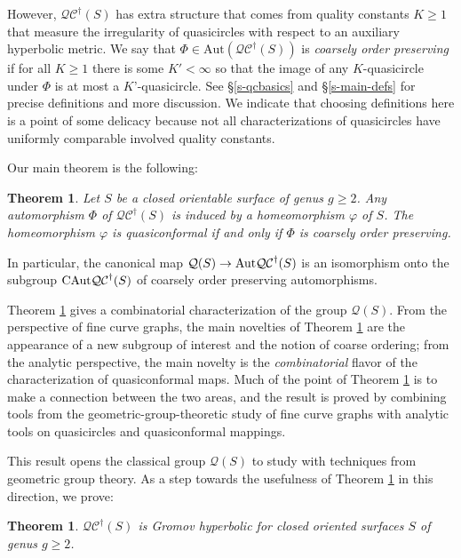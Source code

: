 \documentclass[12pt,a4paper]{amsart}
\theoremstyle{definition}
\theoremstyle{plain}
\numberwithin{equation}{section}
\newcommand{\qcg}{\mathcal{QC}^{\dagger}}
\newcounter{foo}
\newtheorem{theo}[foo]{Theorem}
\begin{document}
However, $\qcg(S)$ has extra structure that comes from quality constants $K \geq 1$ that measure the irregularity of quasicircles with respect to an auxiliary hyperbolic metric.
We say that $\Phi \in \mathrm{Aut}(\qcg(S))$ is \textit{coarsely order preserving} if for all $K\geq 1$ there is some $K' < \infty$ so that the image of any $K$-quasicircle under $\Phi$ is at most a $K’$-quasicircle. See \S \ref{s-qcbasics} and \S \ref{s-main-defs} for precise definitions and more discussion.
We indicate that choosing definitions here is a point of some delicacy because not all characterizations of quasicircles have uniformly comparable involved quality constants.

Our main theorem is the following:

\begin{theo}\label{thm-first}
    Let $S$ be a closed orientable surface of genus $g \geq 2$.
    Any automorphism $\Phi$ of $\mathcal{QC}^\dagger(S)$ is induced by a homeomorphism $\varphi$ of $S$.
    The homeomorphism $\varphi$ is quasiconformal if and only if $\Phi$ is coarsely order preserving.
\end{theo}

In particular, the canonical map $\mathcal{Q}(S) \to {\rm{Aut}}\mathcal{QC}^{\dagger}(S)$ is an isomorphism onto the subgroup ${\rm{CAut}}\mathcal{QC}^{\dagger}(S)$ of coarsely order preserving automorphisms.

Theorem \ref{thm-first} gives a combinatorial characterization of the group $\mathcal{Q}(S)$.
From the perspective of fine curve graphs, the main novelties of Theorem \ref{thm-first} are the appearance of a new subgroup of interest and the notion of coarse ordering; from the analytic perspective, the main novelty is the \textit{combinatorial} flavor of the characterization of quasiconformal maps.
Much of the point of Theorem \ref{thm-first} is to make a connection between the two areas, and the result is proved by combining tools from the geometric-group-theoretic study of fine curve graphs with analytic tools on quasicircles and quasiconformal mappings.


This result opens the classical group $\mathcal{Q}(S)$ to study with techniques from geometric group theory.
As a step towards the usefulness of Theorem \ref{thm-first} in this direction, we prove:

\begin{theo}\label{thm-hyperbolic}
    $\qcg(S)$ is Gromov hyperbolic for closed oriented surfaces $S$ of genus $g \geq 2$.
\end{theo}
\end{document}
